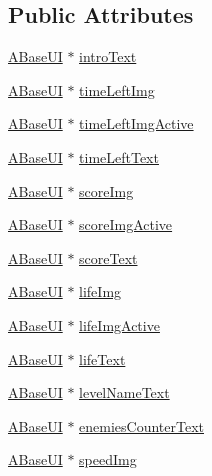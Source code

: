 \subsection*{Public Attributes}
\begin{DoxyCompactItemize}
\item 
\hyperlink{class_a_base_u_i}{A\+Base\+UI} $\ast$ \hyperlink{struct_scene_game_1_1_all_u_i_a82d9196113e2660cc8454ee899fc1043}{intro\+Text}
\item 
\hyperlink{class_a_base_u_i}{A\+Base\+UI} $\ast$ \hyperlink{struct_scene_game_1_1_all_u_i_a5113945b9301e3296bbbb0ca88b86e0a}{time\+Left\+Img}
\item 
\hyperlink{class_a_base_u_i}{A\+Base\+UI} $\ast$ \hyperlink{struct_scene_game_1_1_all_u_i_af666a8139e97e44a3006499d7de86796}{time\+Left\+Img\+Active}
\item 
\hyperlink{class_a_base_u_i}{A\+Base\+UI} $\ast$ \hyperlink{struct_scene_game_1_1_all_u_i_aea70a8401c9c490dadcd30469a44803b}{time\+Left\+Text}
\item 
\hyperlink{class_a_base_u_i}{A\+Base\+UI} $\ast$ \hyperlink{struct_scene_game_1_1_all_u_i_a76912ab53f28efd38bc24adba2311dde}{score\+Img}
\item 
\hyperlink{class_a_base_u_i}{A\+Base\+UI} $\ast$ \hyperlink{struct_scene_game_1_1_all_u_i_a7bd1f8513303935dd9df7561a328cd55}{score\+Img\+Active}
\item 
\hyperlink{class_a_base_u_i}{A\+Base\+UI} $\ast$ \hyperlink{struct_scene_game_1_1_all_u_i_a4e884d8b17410c14738c3da9ffbf314a}{score\+Text}
\item 
\hyperlink{class_a_base_u_i}{A\+Base\+UI} $\ast$ \hyperlink{struct_scene_game_1_1_all_u_i_a3bd05d7a575390e40911c88e1a810a41}{life\+Img}
\item 
\hyperlink{class_a_base_u_i}{A\+Base\+UI} $\ast$ \hyperlink{struct_scene_game_1_1_all_u_i_a36757bea87e2bd501cb94b8e516b1116}{life\+Img\+Active}
\item 
\hyperlink{class_a_base_u_i}{A\+Base\+UI} $\ast$ \hyperlink{struct_scene_game_1_1_all_u_i_ae86957abe25219086d029f8630f0464f}{life\+Text}
\item 
\hyperlink{class_a_base_u_i}{A\+Base\+UI} $\ast$ \hyperlink{struct_scene_game_1_1_all_u_i_a95a0c8b41d60f31311ed18479992ad32}{level\+Name\+Text}
\item 
\hyperlink{class_a_base_u_i}{A\+Base\+UI} $\ast$ \hyperlink{struct_scene_game_1_1_all_u_i_ac9e2b2c6417f7739b4dd5ea3505a61f1}{enemies\+Counter\+Text}
\item 
\hyperlink{class_a_base_u_i}{A\+Base\+UI} $\ast$ \hyperlink{struct_scene_game_1_1_all_u_i_a8ee55851b3bb4ce8b7471b909ed53337}{speed\+Img}

\end{DoxyCompactItemize}
